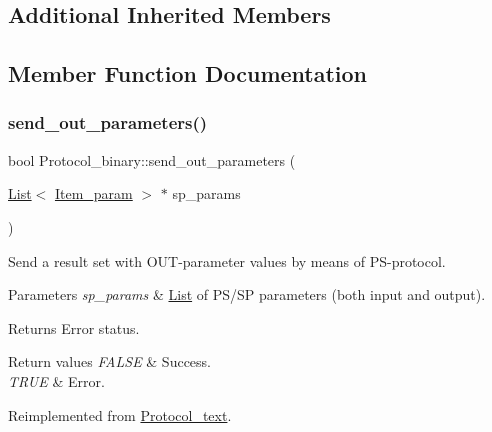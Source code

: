 \subsection*{Additional Inherited Members}


\subsection{Member Function Documentation}
\mbox{\label{classProtocol__binary_a912d03865e662d1568ae766a6371a3b1}} 
\subsubsection{\texorpdfstring{send\+\_\+out\+\_\+parameters()}{send\_out\_parameters()}}
{\footnotesize\ttfamily bool Protocol\+\_\+binary\+::send\+\_\+out\+\_\+parameters (\begin{DoxyParamCaption}\item[{\mbox{\hyperlink{classList}{List}}$<$ \mbox{\hyperlink{classItem__param}{Item\+\_\+param}} $>$ $\ast$}]{sp\+\_\+params }\end{DoxyParamCaption})\hspace{0.3cm}{\ttfamily [virtual]}}

Send a result set with O\+UT-\/parameter values by means of PS-\/protocol.


\begin{DoxyParams}{Parameters}
{\em sp\+\_\+params} & \mbox{\hyperlink{classList}{List}} of P\+S/\+SP parameters (both input and output).\\
\hline
\end{DoxyParams}
\begin{DoxyReturn}{Returns}
Error status. 
\end{DoxyReturn}

\begin{DoxyRetVals}{Return values}
{\em F\+A\+L\+SE} & Success. \\
\hline
{\em T\+R\+UE} & Error. \\
\hline
\end{DoxyRetVals}


Reimplemented from \mbox{\hyperlink{classProtocol__text_ae0e360cdf482e877b4bd1e73b66db5d7}{Protocol\+\_\+text}}.


